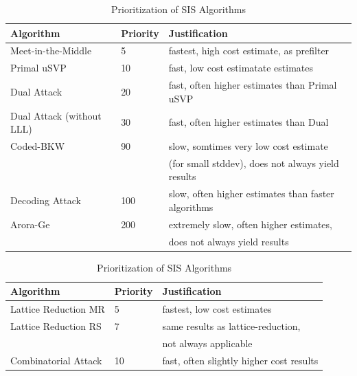 \begin{table}[h!]
    \centering
    \begin{tabular}[]{lll}
        \toprule
        Algorithm                 & Priority & Justification                                       \\\hline
        Meet-in-the-Middle        & 5        & fastest, high cost estimate, as prefilter           \\
        Primal uSVP               & 10       & fast, low cost estimatate estimates                 \\
        Dual Attack               & 20       & fast, often higher estimates than Primal uSVP       \\
        Dual Attack (without LLL) & 30       & fast, often higher estimates than Dual              \\
        Coded-BKW                 & 90       & slow, somtimes very low cost estimate               \\
                                  &          & (for small stddev), does not always yield results   \\
        Decoding Attack           & 100      & slow, often higher estimates than faster algorithms \\
        Arora-Ge                  & 200      & extremely slow, often higher estimates,             \\
                                  &          & does not always yield results                       \\
        \bottomrule
    \end{tabular}
    \caption{Prioritization of LWE Algorithms}\label{tab:lwe-alg-prio}
    \vspace{1cm}
    \begin{tabular}[]{lll}
        \toprule
        Algorithm            & Priority & Justification                            \\\hline
        Lattice Reduction MR & 5        & fastest, low cost estimates              \\
        Lattice Reduction RS & 7        & same results as lattice-reduction,       \\
                             &          & not always applicable                    \\
        Combinatorial Attack & 10       & fast, often slightly higher cost results \\
        \bottomrule
    \end{tabular}
    \caption{Prioritization of SIS Algorithms}\label{tab:sis-alg-prio}
\end{table}

